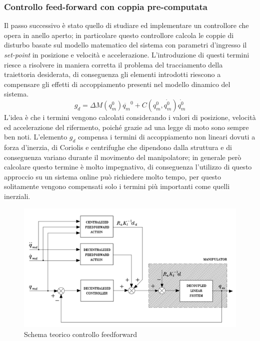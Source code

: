 \subsubsection{Controllo feed-forward con coppia pre-computata}
Il passo successivo è stato quello di studiare ed implementare un controllore che opera in anello aperto; in particolare questo controllore calcola le coppie di disturbo basate sul modello matematico del sistema con parametri d'ingresso il \textit{set-point} in posizione e velocità e accelerazione. L'introduzione di questi termini riesce a risolvere in maniera corretta il problema del tracciamento della traiettoria desiderata, di conseguenza gli elementi introdotti riescono a compensare gli effetti di accoppiamento presenti nel modello dinamico del sistema. 
\begin{equation}
g_d = \Delta M(q^0_m)\ddot{q_m}^0 + C(q^0_m,\dot{q_m^0})\dot{q_m^0}
\end{equation}
L'idea è che i termini vengono calcolati considerando i valori di posizione, velocità ed accelerazione del rifermento, poiché grazie ad una legge di moto sono sempre ben noti. L'elemento $g_d$ compensa i termini di accoppiamento non lineari dovuti a forza d'inerzia, di Coriolis e centrifughe che dipendono dalla struttura e di conseguenza variano durante il movimento del manipolatore; in generale però calcolare questo termine è molto impegnativo, di conseguenza l'utilizzo di questo approccio su un sistema online può richiedere molto tempo, per questo solitamente vengono compensati solo i termini più importanti come quelli inerziali.
\begin{figure}[ht]
	\begin{center}
		\includegraphics[scale=0.45]{Immagini/Controllori/FFschema}
		\caption{Schema teorico controllo feedforward}
		\label{fig:FFschema}
	\end{center}
\end{figure}
